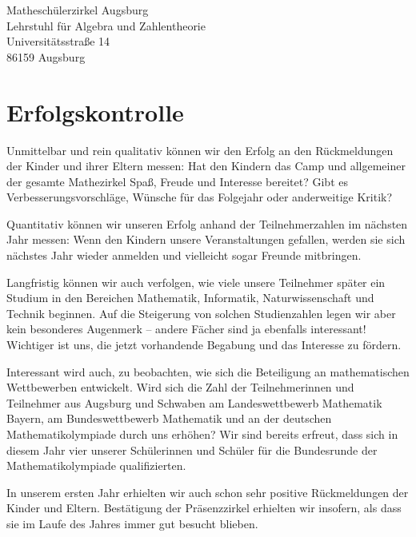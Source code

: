\documentclass[12pt]{zettel}
\begin{document}
\begin{tabbing}
  Matheschülerzirkel Augsburg \\
  Lehrstuhl für Algebra und Zahlentheorie \\
  Universitätsstraße 14 \\
  86159 Augsburg
\end{tabbing}


\section{Erfolgskontrolle}

Unmittelbar und rein qualitativ können wir den Erfolg an den Rückmeldungen der
Kinder und ihrer Eltern messen: Hat den Kindern das Camp und allgemeiner der
gesamte Mathezirkel Spaß, Freude und Interesse bereitet? Gibt es
Verbesserungsvorschläge, Wünsche für das Folgejahr oder anderweitige Kritik?

Quantitativ können wir unseren Erfolg anhand der Teilnehmerzahlen im nächsten
Jahr messen: Wenn den Kindern unsere Veranstaltungen gefallen, werden sie sich
nächstes Jahr wieder anmelden und vielleicht sogar Freunde mitbringen.

Langfristig können wir auch verfolgen, wie viele unsere Teilnehmer später ein
Studium in den Bereichen Mathematik, Informatik, Naturwissenschaft und Technik
beginnen. Auf die Steigerung von solchen Studienzahlen legen wir aber kein
besonderes Augenmerk -- andere Fächer sind ja ebenfalls interessant! Wichtiger
ist uns, die jetzt vorhandende Begabung und das Interesse zu fördern.

Interessant wird auch, zu beobachten, wie sich die Beteiligung an
mathematischen Wettbewerben entwickelt. Wird sich die Zahl der
Teilnehmerinnen und Teilnehmer aus Augsburg und Schwaben am Landeswettbewerb
Mathematik Bayern, am Bundeswettbewerb Mathematik und an der deutschen
Mathematikolympiade durch uns erhöhen? Wir sind bereits erfreut,
dass sich in diesem Jahr vier unserer Schülerinnen und Schüler für die
Bundesrunde der Mathematikolympiade qualifizierten.

In unserem ersten Jahr erhielten wir auch schon sehr positive Rückmeldungen der
Kinder und Eltern. Bestätigung der Präsenzzirkel erhielten wir insofern, als
dass sie im Laufe des Jahres immer gut besucht blieben.


\end{document}
